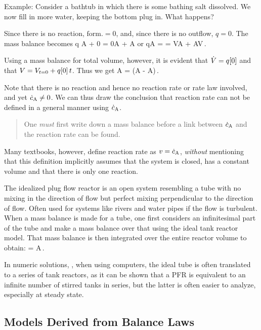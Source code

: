 Example: Consider a bathtub in which there is some bathing salt dissolved. We now fill in more water, keeping the bottom plug in. What happens?

Since there is no reaction, $\text{form.} = 0$, and, since there is no outflow, $q = 0$. The mass balance becomes
\beq
{}\implies
q \conc A + 0 = 0\conc A + \dtamount A
\eeq
or
\beq
q\conc A =  = V\dtconc A + \conc A\dt V\,.
\eeq

Using a mass balance for total volume, however, it is evident that $\dot{V} = q\!\left[{0}\right]$ and that $V = V_{t = 0} + q\!\left[{0}\right]t$. Thus we get
\beq
\dtconc A = \left(\conc A - \conc A\right)\,.
\eeq

Note that there is no reaction and hence no reaction rate or rate law involved, and yet $\dtconc A\neq 0$. We can thus draw the conclusion that reaction rate can not be defined in a general manner using $\dtconc A$. 
\begin{quote}
One \emph{must} first write down a mass balance before a link between $\dtconc A$ and the reaction rate can be found. 
\end{quote}
Many textbooks, however, define reaction rate as $v = \dtconc A$, \emph{without} mentioning that this definition implicitly assumes that the system is closed, has a constant volume and that there is only one reaction.

 The idealized plug flow reactor is an open system resembling a tube with no mixing in the direction of flow but perfect mixing perpendicular to the direction of flow. Often used for systems like rivers and water pipes if the flow is turbulent. When a mass balance is made for a tube, one first considers an infinitesimal part of the tube and make a mass balance over that using the ideal tank reactor model. That mass balance is then integrated over the entire reactor volume to obtain:
\beq
{} = \rrate A\,.
\eeq

In numeric solutions, \eg, when using computers, the ideal tube is often translated to a series of tank reactors, as it can be shown that a PFR is equivalent to an infinite number of stirred tanks in series, but the latter is often easier to analyze, especially at steady state.


\subsection{Models Derived from Balance Laws}

